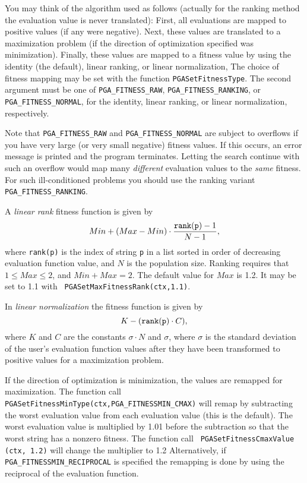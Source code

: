 \documentclass{report}
\begin{document}
You may think of the algorithm used as follows (actually for the ranking
method the evaluation value is never translated):
First, all evaluations are
mapped to positive values (if any were negative).  Next, these values are
translated to a maximization problem (if the direction of optimization
specified was minimization).  Finally, these values are mapped to a fitness
value by using the identity (the default), linear ranking, or linear
normalization, The choice of fitness mapping may be set with the function
\verb+PGASetFitnessType+.  The second argument must be one of
\verb+PGA_FITNESS_RAW+, \verb+PGA_FITNESS_RANKING+, or
\verb+PGA_FITNESS_NORMAL+, for the identity, linear ranking, or linear
normalization, respectively.

Note that \verb+PGA_FITNESS_RAW+ and \verb+PGA_FITNESS_NORMAL+ are
subject to overflows if you have
very large (or very small negative) fitness values. If this occurs, an
error message is printed and the program terminates.
Letting the search continue with such an overflow would map many
\textit{different} evaluation values to the \textit{same} fitness.
For such ill-conditioned problems you should use the ranking
variant \verb+PGA_FITNESS_RANKING+.

A {\em linear rank} fitness function \cite{Ba87,Wh89} is given by
\begin{equation}
Min + (Max - Min)\cdot\frac{{\tt rank(p)}-1}{N-1},\label{eq:rank-select}
\end{equation}
where {\tt rank(p)} is the index of string {\tt p} in a list sorted in order
of decreasing evaluation function value, and $N$ is the population size.
Ranking requires that $1 \leq Max \leq 2$, and $Min + Max = 2$.  The default
value for $Max$ is 1.2.  It may be set to 1.1 with {\tt
PGASetMaxFitnessRank(ctx,1.1)}.

In {\em linear normalization} the fitness function is given by
\begin{equation}
K - ({\tt rank(p)} \cdot C),
\end{equation}
where $K$ and $C$ are the constants $\sigma \cdot N$ and $\sigma$,
where $\sigma$
is the standard deviation of the user's evaluation function values after they
have been transformed to positive values for a maximization problem.

If the direction of optimization is minimization, the values are remapped for
maximization.  The function call {\tt
PGASetFitnessMinType(ctx,PGA\_FITNESSMIN\_CMAX)} will remap by subtracting the
worst evaluation value from each evaluation value (this is the default).  The
worst evaluation value is multiplied by 1.01 before the subtraction so that
the worst string has a nonzero fitness.  The function call {\tt
PGASetFitnessCmaxValue (ctx, 1.2)} will change the multiplier to 1.2
Alternatively, if {\tt PGA\_FITNESSMIN\_RECIPROCAL} is specified the remapping
is done by using the reciprocal of the evaluation function.
\end{document}
